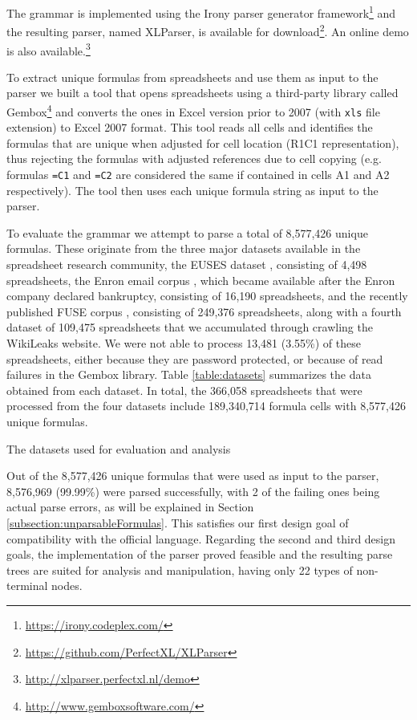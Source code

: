 \documentclass[times]{smrauth}
\begin{document}
The grammar is implemented using the Irony parser generator framework\footnote{\url{https://irony.codeplex.com/}} and the resulting parser, named XLParser, is available for download\footnote{\url{https://github.com/PerfectXL/XLParser}}. An online demo is also available.\footnote{\url{http://xlparser.perfectxl.nl/demo}}

To extract unique formulas from spreadsheets and use them as input to the parser we built a tool that opens spreadsheets using a third-party library called Gembox\footnote{\url{http://www.gemboxsoftware.com/}} and converts the ones in Excel version prior to 2007 (with \texttt{xls} file extension) to Excel 2007 format. This tool reads all cells and identifies the formulas that are unique when adjusted for cell location (R1C1 representation), thus rejecting the formulas with adjusted references due to cell copying (e.g. formulas \texttt{=C1} and \texttt{=C2} are considered the same if contained in cells A1 and A2 respectively). The tool then uses each unique formula string as input to the parser.

To evaluate the grammar we attempt to parse a total of 8,577,426 unique formulas. These originate from the three major datasets available in the spreadsheet research community, the EUSES dataset \cite{euses}, consisting of 4,498 spreadsheets, the Enron email corpus \cite{enron}, which became available after the Enron company declared bankruptcy, consisting of 16,190 spreadsheets, and the recently published FUSE corpus \cite{fuse}, consisting of 249,376 spreadsheets, along with a fourth dataset of 109,475 spreadsheets that we accumulated through crawling the WikiLeaks website. We were not able to process 13,481 (3.55\%) of these spreadsheets, either because they are password protected, or because of read failures in the Gembox library. Table \ref{table:datasets} summarizes the data obtained from each dataset. In total, the 366,058 spreadsheets that were processed from the four datasets include 189,340,714 formula cells with 8,577,426 unique formulas.

\begin{table}[]
	\centering
	\caption{The datasets used for evaluation and analysis}
	\label{table:datasets}
	
\end{table}

Out of the 8,577,426 unique formulas that were used as input to the parser, 8,576,969 (99.99\%) were parsed successfully, with 2 of the failing ones being actual parse errors, as will be explained in Section \ref{subsection:unparsableFormulas}. This satisfies our first design goal of compatibility with the official language. Regarding the second and third design goals, the implementation of the parser proved feasible and the resulting parse trees are suited for analysis and manipulation, having only 22 types of non-terminal nodes.
\end{document}
